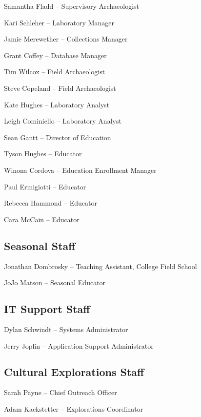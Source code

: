 \documentclass[
  12pt,
]{krantz}
\begin{document}
Samantha Fladd -- Supervisory Archaeologist

Kari Schleher -- Laboratory Manager

Jamie Merewether -- Collections Manager

Grant Coffey -- Database Manager

Tim Wilcox -- Field Archaeologist

Steve Copeland -- Field Archaeologist

Kate Hughes -- Laboratory Analyst

Leigh Cominiello -- Laboratory Analyst

Sean Gantt -- Director of Education

Tyson Hughes -- Educator

Winona Cordova -- Education Enrollment Manager

Paul Ermigiotti -- Educator

Rebecca Hammond -- Educator

Cara McCain -- Educator

\hypertarget{seasonal-staff}{%
\subsection*{Seasonal Staff}\label{seasonal-staff}}

Jonathan Dombrosky -- Teaching Assistant, College Field School

JoJo Matson -- Seasonal Educator

\hypertarget{it-support-staff}{%
\subsection*{IT Support Staff}\label{it-support-staff}}

Dylan Schwindt -- Systems Administrator

Jerry Joplin -- Application Support Administrator

\hypertarget{cultural-explorations-staff}{%
\subsection*{Cultural Explorations Staff}\label{cultural-explorations-staff}}

Sarah Payne -- Chief Outreach Officer

Adam Kackstetter -- Explorations Coordinator
\end{document}
